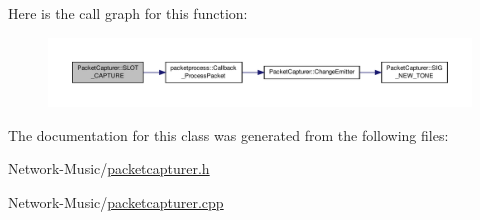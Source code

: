 Here is the call graph for this function\-:
\nopagebreak
\begin{figure}[H]
\begin{center}
\leavevmode
\includegraphics[width=350pt]{class_packet_capturer_a3f008c97baedf3417013623b05b0de34_cgraph}
\end{center}
\end{figure}




The documentation for this class was generated from the following files\-:\begin{DoxyCompactItemize}
\item 
Network-\/\-Music/\hyperlink{packetcapturer_8h}{packetcapturer.\-h}\item 
Network-\/\-Music/\hyperlink{packetcapturer_8cpp}{packetcapturer.\-cpp}\end{DoxyCompactItemize}
